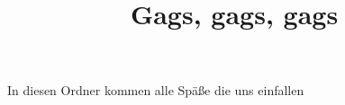 ﻿\documentclass{article}
\title{Gags, gags, gags}
\begin{document}
\maketitle

In diesen Ordner kommen alle Späße die uns einfallen
\end{document}
